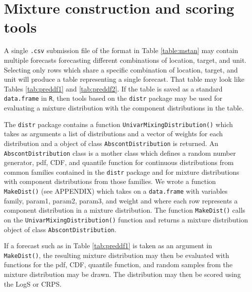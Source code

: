 \documentclass[11pt,notitlepage]{isuthesis}
\begin{document}
\section{Mixture construction and scoring tools}
\label{section:tools}

A single \texttt{.csv} submission file of the format in Table \ref{table:mstan} 
may contain multiple forecasts forecasting different combinations of location,
target, and unit. Selecting only rows which share a specific combination of 
location, target, and unit will produce a table representing a single forecast.
That table may look like Tables \ref{tab:preddf1} and 
\ref{tab:preddf2}. If the table is saved as a standard \texttt{data.frame} in 
\texttt{R}, then tools based on the \texttt{distr} package 
\cite[]{camphausen2007distr} may be used for evaluating a mixture distribution 
with the component distributions in the table. 


The \texttt{distr} package contains a function 
\texttt{UnivarMixingDistribution()} which takes as arguments a list of 
distributions
and a vector of weights for each distribution and a object of class 
\texttt{AbscontDistribution} is returned. An \texttt{AbscontDistribution} class
is a mother class which defines a random number generator, pdf,
CDF, and quantile function for continuous distributions from common
families contained in the \texttt{distr} package
and for mixture distributions with 
component distributions from those families.
We wrote a function \texttt{MakeDist()} (see APPENDIX)
which takes on a \texttt{data.frame} with variables
family, param1, param2, param3, and weight and where each row represents a
component distribution in a mixture distribution. The function 
\texttt{MakeDist()} calls on the \texttt{UnivarMixingDistribution()} function
and returns a mixture distribution object of class \texttt{AbscontDistribution}.

If a forecast such as in Table \ref{tab:preddf1} is taken as an argument in 
\texttt{MakeDist()}, the resulting mixture distribution may then be evaluated 
with functions for the pdf, CDF, quantile function, and random samples from the
mixture distribution may be drawn. The distribution may then be scored using the
LogS or CRPS.
\end{document}
